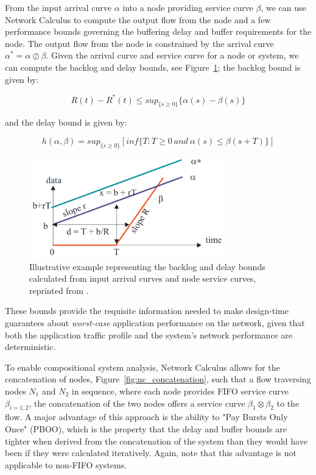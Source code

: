 From the input arrival curve $\alpha$ into a node providing service
curve $\beta$, we can use Network Calculus to compute the output flow
from the node and a few performance bounds governing the buffering
delay and buffer requirements for the node.  The output flow from the
node is constrained by the arrival curve $\alpha^* =
\alpha\oslash\beta$.  Given the arrival curve and service curve for a
node or system, we can compute the backlog and delay bounds, see
Figure~\ref{fig:nc_bounds}; the backlog bound is given by:

\begin{equation}
  R(t)-R^*(t)\leq sup_{\{s\geq 0\}}\{\alpha(s)-\beta(s)\}
\end{equation}

and the delay bound is given by: 

\begin{equation}
  h(\alpha,\beta)=sup_{\{s\geq0\}}[inf\{T:T\geq0\ and\ \alpha(s)\leq\beta(s+T)\}]
\end{equation}

\begin{figure}[htb]
  \centering
  \includegraphics[width=0.75\textwidth]{figs/nc_bounds.png}
  \caption{Illustrative example representing the backlog and delay
    bounds calculated from input arrival curves and node service
    curves, reprinted from \cite{NCBook}.}
  \label{fig:nc_bounds}
\end{figure}

These bounds provide the requisite information needed to make
design-time guarantees about \emph{worst-case} application performance
on the network, given that both the application traffic profile and
the system's network performance are deterministic.

To enable compositional system analysis, Network Calculus allows for
the concatenation of nodes, Figure~\ref{fig:nc_concatenation}, such
that a flow traversing nodes $N_1$ and $N_2$ in sequence, where each
node provides FIFO service curve $\beta_{i=1,2}$, the concatenation of
the two nodes offers a service curve $\beta_1\otimes\beta_2$ to the
flow.  A major advantage of this approach is the ability to "Pay
Bursts Only Once" (PBOO), which is the property that the delay and
buffer bounds are tighter when derived from the concatenation of the
system than they would have been if they were calculated iteratively.
Again, note that this advantage is not applicable to non-FIFO
systems\cite{NCBook}.

